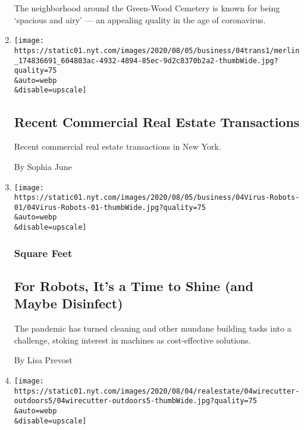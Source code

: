 \begin{enumerate}
  The neighborhood around the Green-Wood Cemetery is known for being
  `spacious and airy' --- an appealing quality in the age of
  coronavirus.
\item
  \href{/2020/08/04/business/recent-commercial-real-estate-transactions.html}{}

  \texttt{[image: https://static01.nyt.com/images/2020/08/05/business/04trans1/merlin\_174836691\_604803ac-4932-4894-85ec-9d2c8370b2a2-thumbWide.jpg?quality=75\\\&auto=webp\\\&disable=upscale]}

  \hypertarget{recent-commercial-real-estate-transactions}{%
  \subsection{Recent Commercial Real Estate
  Transactions}\label{recent-commercial-real-estate-transactions}}

  Recent commercial real estate transactions in New York.

  By Sophia June
\item
  \href{/2020/08/04/business/robot-cleaning-coronavirus.html}{}

  \texttt{[image: https://static01.nyt.com/images/2020/08/05/business/04Virus-Robots-01/04Virus-Robots-01-thumbWide.jpg?quality=75\\\&auto=webp\\\&disable=upscale]}

  \hypertarget{square-feet}{%
  \subsubsection{Square Feet}\label{square-feet}}

  \hypertarget{for-robots-its-a-time-to-shine-and-maybe-disinfect}{%
  \subsection{For Robots, It's a Time to Shine (and Maybe
  Disinfect)}\label{for-robots-its-a-time-to-shine-and-maybe-disinfect}}

  The pandemic has turned cleaning and other mundane building tasks into
  a challenge, stoking interest in machines as cost-effective solutions.

  By Lisa Prevost
\item
  \href{/2020/08/04/realestate/upgrade-your-outdoor-space.html}{}

  \texttt{[image: https://static01.nyt.com/images/2020/08/04/realestate/04wirecutter-outdoors5/04wirecutter-outdoors5-thumbWide.jpg?quality=75\\\&auto=webp\\\&disable=upscale]}


\end{enumerate}
